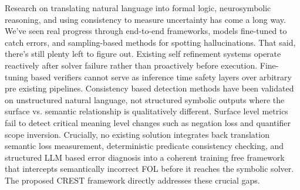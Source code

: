 Research on translating natural language into formal logic, neurosymbolic reasoning, and using consistency to measure uncertainty has come a long way. We've seen real progress through end-to-end frameworks, models fine-tuned to catch errors, and sampling-based methods for spotting hallucinations. That said, there's still plenty left to figure out. Existing self refinement systems operate reactively after solver failure rather than proactively before execution. Fine-tuning based verifiers cannot serve as inference time safety layers over arbitrary pre existing pipelines. Consistency based detection methods have been validated on unstructured natural language, not structured symbolic outputs where the surface vs. semantic relationship is qualitatively different. Surface level metrics fail to detect critical meaning level changes such as negation loss and quantifier scope inversion. Crucially, no existing solution integrates back translation semantic loss measurement, deterministic predicate consistency checking, and structured LLM based error diagnosis into a coherent training free framework that intercepts semantically incorrect FOL before it reaches the symbolic solver. The proposed CREST framework directly addresses these crucial gaps.